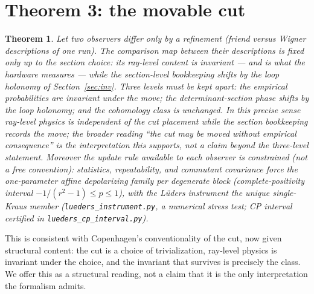 \documentclass[11pt]{article}
\newtheorem{theorem}{Theorem}\newtheorem{lemma}{Lemma}\newtheorem{conjecture}{Conjecture}
\begin{document}
\section{Theorem 3: the movable cut}
\begin{theorem}\label{thm:cut}
Let two observers differ only by a refinement (friend versus Wigner descriptions of one
run). The comparison map between their descriptions is fixed only up to the section
choice: its ray-level content is invariant --- and is what the hardware measures ---
while the section-level bookkeeping shifts by the loop holonomy of
Section~\ref{sec:inv}. Three levels must be kept apart: the empirical probabilities are invariant
under the move; the determinant-\emph{section} phase shifts by the loop holonomy; and the cohomology
class is unchanged. In this precise sense ray-level physics is independent of the cut placement while
the section bookkeeping records the move; the broader reading ``the cut may be moved without empirical
consequence'' is the interpretation this supports, not a claim beyond the three-level statement.
Moreover the update rule available to each observer is constrained (not a free convention):
statistics, repeatability, and commutant covariance force the one-parameter affine depolarizing family
per degenerate block (complete-positivity interval $-1/(r^2-1)\le p\le 1$), with the L\"uders
instrument the unique single-Kraus member (\texttt{lueders\_instrument.py}, a numerical stress test;
CP interval certified in \texttt{lueders\_cp\_interval.py}).
\end{theorem}
This is consistent with Copenhagen's conventionality of the cut, now given structural content:
the cut is a choice of trivialization, ray-level physics is invariant under the choice, and the
invariant that survives is precisely the class. We offer this as a structural reading, not a claim
that it is the only interpretation the formalism admits.
\end{document}
